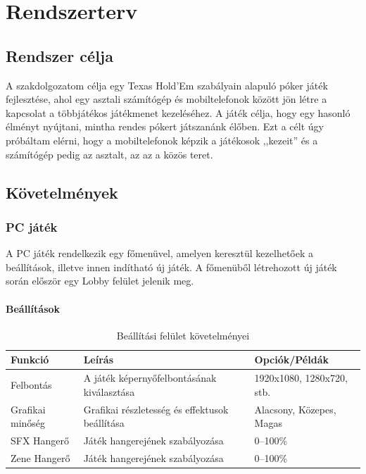 \documentclass[]{thesis-ekf}
\theoremstyle{definition}
\theoremstyle{remark}
\begin{document}
\chapter{Rendszerterv}

\section{Rendszer célja}
A szakdolgozatom célja egy Texas Hold'Em szabályain alapuló póker játék fejlesztése, ahol egy asztali számítógép és mobiltelefonok között jön létre a kapcsolat a többjátékos játékmenet kezeléséhez. A játék célja, hogy egy hasonló élményt nyújtani, mintha rendes pókert játszanánk élőben. Ezt a célt úgy próbáltam elérni, hogy a mobiltelefonok képzik a játékosok ,,kezeit'' és a számítógép pedig az asztalt, az az a közös teret.

\section{Követelmények}
\subsection{PC játék}
A PC játék rendelkezik egy főmenüvel, amelyen keresztül kezelhetőek a beállítások, illetve innen indítható új játék. A főmenüből létrehozott új játék során először egy Lobby felület jelenik meg.

\subsubsection{Beállítások}

\begin{table}[ht!]
	\centering
	\footnotesize
	\begin{tabular}{|p{4cm}|p{7cm}|p{4cm}|}
		\hline
		\textbf{Funkció} & \textbf{Leírás} & \textbf{Opciók/Példák} \\ 
		\hline
		Felbontás & A játék képernyőfelbontásának kiválasztása & 1920x1080, 1280x720, stb. \\ 
		\hline
		Grafikai minőség & Grafikai részletesség és effektusok beállítása & Alacsony, Közepes, Magas \\ 
		\hline
		SFX Hangerő & Játék hangerejének szabályozása & 0–100\% \\ 
		\hline
		Zene Hangerő & Játék hangerejének szabályozása & 0–100\% \\ 
		\hline
	\end{tabular}
	\caption{Beállítási felület követelményei}
\end{table}
\end{document}
